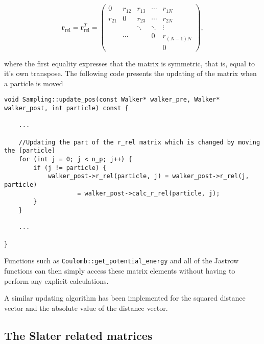 \begin{equation}
\mathbf{r}_\mathrm{rel} = \mathbf{r}_\mathrm{rel}^T = \left( \begin{array}{ccccc}
0 & r_{12} & r_{13} & \cdots & r_{1N} \\
r_{21} & 0 & r_{23} & \cdots & r_{2N}  \\
 &  & \ddots & \ddots & \vdots \\
 & \cdots &  & 0 & r_{(N-1)N} \\
 &  &  &  & 0\end{array} \right),
\end{equation}

where the first equality expresses that the matrix is symmetric, that is, equal to it's own transpose. The following code presents the updating of the matrix when a particle is moved

\vspace{0.25cm}
\begin{lstlisting}[caption={The code used to update the relative distance matrix of a walker when a particle is moved. Pay extra attention to line 8 where the symmetry of the matrix is exploited to further decrease the number of calls to the relative distance function in line 9.}]
void Sampling::update_pos(const Walker* walker_pre, Walker* walker_post, int particle) const {

    ...

    //Updating the part of the r_rel matrix which is changed by moving the [particle]
    for (int j = 0; j < n_p; j++) {
        if (j != particle) {
            walker_post->r_rel(particle, j) = walker_post->r_rel(j, particle)
                    = walker_post->calc_r_rel(particle, j);
        }
    }
    
    ...

}
\end{lstlisting}


Functions such as \verb+Coulomb::get_potential_energy+ and all of the Jastrow functions can then simply access these matrix elements without having to perform any explicit calculations.

A similar updating algorithm has been implemented for the squared distance vector and the absolute value of the distance vector. 

\subsection{The Slater related matrices}
\label{sec:storeSlater}

